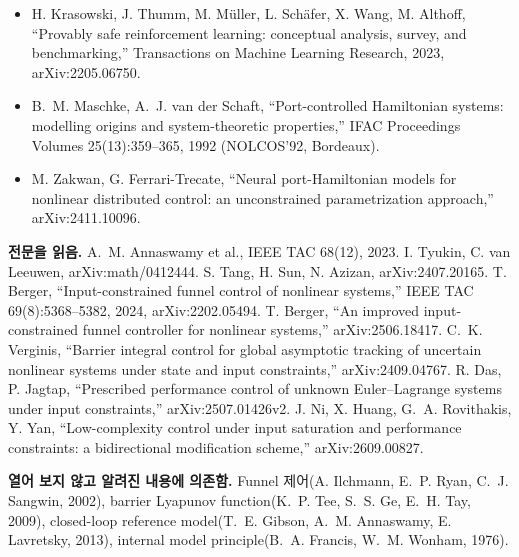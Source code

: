 \documentclass[11pt]{article}\usepackage[margin=1in]{geometry}\usepackage{amsmath,amssymb,amsthm,mathtools}\usepackage{graphicx}\graphicspath{{figures/}{../figures/}{figs/}{./}}\usepackage{enumitem}\usepackage{hyperref}\usepackage{cleveref}\usepackage{tikz}\usetikzlibrary{arrows.meta,positioning,calc,shapes.geometric}\usepackage{float}\usepackage{rotating}\usepackage[most]{tcolorbox}\usepackage{kotex}\usepackage{booktabs}\emergencystretch=1.6em\tolerance=2000 \crefname{assumption}{Assumption}{Assumptions}\Crefname{assumption}{Assumption}{Assumptions}\crefname{definition}{Definition}{Definitions}\Crefname{definition}{Definition}{Definitions}\crefname{proposition}{Proposition}{Propositions}\Crefname{proposition}{Proposition}{Propositions}\crefname{fact}{Fact}{Facts}\Crefname{fact}{Fact}{Facts} \newtheorem{assumption}{Assumption}\newtheorem{definition}{Definition}\newtheorem{lemma}{Lemma}\newtheorem{proposition}{Proposition}\newtheorem{theorem}{Theorem}\newtheorem{corollary}{Corollary}\newtheorem{fact}{Fact}\theoremstyle{remark}\newtheorem{remark}{Remark} \newcommand{\R}{\mathbb{R}}\newcommand{\xb}{\bar x}\newcommand{\Ab}{\bar A}\newcommand{\By}{\bar B_y}\newcommand{\U}{\mathcal U}\newcommand{\Z}{\mathcal Z}
\begin{document}
\begin{itemize}
\item H. Krasowski, J. Thumm, M. M\"uller, L. Sch\"afer, X. Wang, M. Althoff, ``Provably safe reinforcement learning: conceptual analysis, survey, and benchmarking,'' Transactions on Machine Learning Research, 2023, arXiv:2205.06750.
\item B.~M. Maschke, A.~J. van der Schaft, ``Port-controlled Hamiltonian systems: modelling origins and system-theoretic properties,'' IFAC Proceedings Volumes 25(13):359--365, 1992 (NOLCOS'92, Bordeaux).
\item M. Zakwan, G. Ferrari-Trecate, ``Neural port-Hamiltonian models for nonlinear distributed control: an unconstrained parametrization approach,'' arXiv:2411.10096.
\end{itemize}

\textbf{전문을 읽음.} A.~M. Annaswamy et al., IEEE TAC 68(12), 2023. I. Tyukin, C. van Leeuwen, arXiv:math/0412444. S. Tang, H. Sun, N. Azizan, arXiv:2407.20165. T. Berger, ``Input-constrained funnel control of nonlinear systems,'' IEEE TAC 69(8):5368--5382, 2024, arXiv:2202.05494. T. Berger, ``An improved input-constrained funnel controller for nonlinear systems,'' arXiv:2506.18417. C.~K. Verginis, ``Barrier integral control for global asymptotic tracking of uncertain nonlinear systems under state and input constraints,'' arXiv:2409.04767. R. Das, P. Jagtap, ``Prescribed performance control of unknown Euler--Lagrange systems under input constraints,'' arXiv:2507.01426v2. J. Ni, X. Huang, G.~A. Rovithakis, Y. Yan, ``Low-complexity control under input saturation and performance constraints: a bidirectional modification scheme,'' arXiv:2609.00827.

\textbf{열어 보지 않고 알려진 내용에 의존함.} Funnel 제어(A. Ilchmann, E.~P. Ryan, C.~J. Sangwin, 2002), barrier Lyapunov function(K.~P. Tee, S.~S. Ge, E.~H. Tay, 2009), closed-loop reference model(T.~E. Gibson, A.~M. Annaswamy, E. Lavretsky, 2013), internal model principle(B.~A. Francis, W.~M. Wonham, 1976).
\end{document}
